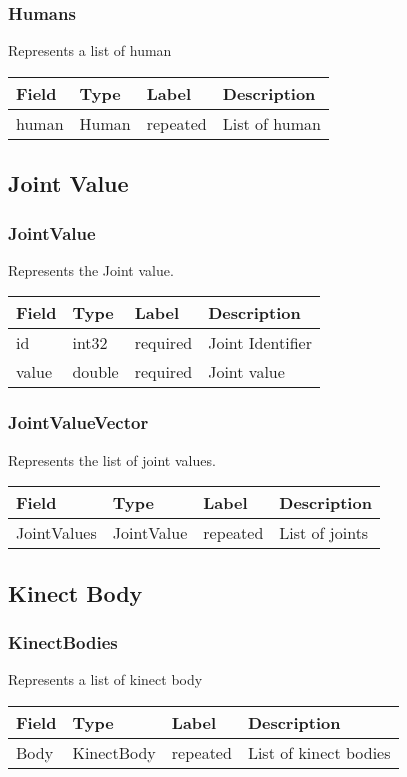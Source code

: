 \subsubsection*{Humans} Represents a list of human
\begin{longtable}[l]{@{}llll@{}}
\toprule
Field & Type & Label & Description\tabularnewline
\midrule
\endhead
human & Human & repeated & List of human\tabularnewline
\bottomrule
\end{longtable}
\subsection{Joint Value}\label{jointux5fvalueux5fmap.proto}
\subsubsection*{JointValue} Represents the Joint value.
\begin{longtable}[l]{@{}llll@{}}
\toprule
Field & Type & Label & Description\tabularnewline
\midrule
\endhead
id & int32 & required & Joint Identifier\tabularnewline
value & double & required & Joint value\tabularnewline
\bottomrule
\end{longtable}
\subsubsection*{JointValueVector} Represents the list of joint values.
\begin{longtable}[l]{@{}llll@{}}
\toprule
Field & Type & Label & Description\tabularnewline
\midrule
\endhead
JointValues & JointValue & repeated & List of joints\tabularnewline
\bottomrule
\end{longtable}
\subsection{Kinect Body}\label{kinectux5fbody.proto}
\subsubsection*{KinectBodies} Represents a list of kinect body
\begin{longtable}[l]{@{}llll@{}}
\toprule
Field & Type & Label & Description\tabularnewline
\midrule
\endhead
Body & KinectBody & repeated & List of kinect bodies\tabularnewline
\bottomrule
\end{longtable}
